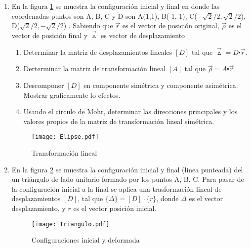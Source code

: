 \documentclass[../notas medios.tex]{subfiles}
\begin{document}
\begin{enumerate}

\item \label{punto01_d} En la  figura \ref{fig1} se muestra la configuración inicial y final en donde las coordenadas puntos son A, B, C y D son A(1,1), B(-1,-1), C($-\sqrt{2}/2,\sqrt{2}/2$), D($\sqrt{2}/2,-\sqrt{2}/2$) . Sabiendo que $\vec{r}$ es el vector de posici\'on original, $\vec{\rho}$ es el vector de posición final y  $\vec{\vartriangle}$ es vector de desplazamiento 

	\begin{enumerate}
	\item Determinar la matriz de desplazamientos lineales $[D]$ tal que	$\vec{\vartriangle}=  D  \centerdot  \vec{r}$. 
	\item Derterminar la matriz de transformaci\'on lineal $[A]$ tal que $\vec{\rho}= A \centerdot \vec{r}$	
	\item Descomponer $[D]$ en componente sim\'etrica y componente asim\'etrica. Mostrar graficamente lo efectos. 	
	\item  Usando el circulo de Mohr, determinar las direcciones principales y los valores propios de la matriz de transformaci\'on lineal sim\'etrica.
	\end{enumerate}
	
	\begin{figure}[H]
		\centering	
	\texttt{[image: Elipse.pdf]}\\
		\caption{Transformaci\'on lineal}
	\label{fig1}
	\end{figure}
	
\newpage

	\item  \label{punto02_d} En la figura \cref{Triangulo} se muestra la configuraci\'on inicial y final (linea punteada) del un triángulo de lado unitario formado por los puntos A, B, C. Para pasar de la configuración inicial a la final se aplica una trasformación lineal de desplazamientos $[D]$, tal que $\lbrace{\Delta}\rbrace = [D]\cdot\lbrace{r}\rbrace$, donde $\Delta$ es el vector desplazamiento, y $r$ es el vector posici\'on inicial.
%
\begin{figure}[H]
	\centering
	\texttt{[image: Triangulo.pdf]} 
	\caption{Configuraciones inicial y deformada}
	\label{Triangulo}
\end{figure}


\end{enumerate}
\end{document}
